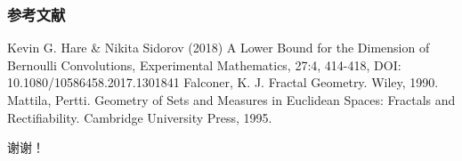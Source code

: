 \documentclass{beamer}
\numberwithin{equation}{section}
\theoremstyle{definition} \newtheorem{law}[thm]{Law}
\theoremstyle{plain} \newtheorem{jury}[thm]{Jury}
\theoremstyle{remark} \newtheorem*{marg}{Margaret}
\begin{document}
\begin{frame}
	\frametitle{参考文献}\small
	\footnotesize{
		\begin{thebibliography}{99} %

			  Kevin G. Hare \& Nikita Sidorov (2018) A Lower Bound for the Dimension of Bernoulli Convolutions, Experimental Mathematics, 27:4, 414-418, DOI: 10.1080/10586458.2017.1301841
			 Falconer, K. J. Fractal Geometry. Wiley, 1990.
			 Mattila, Pertti. Geometry of Sets and Measures in Euclidean Spaces: Fractals and Rectifiability. Cambridge University Press, 1995.

		\end{thebibliography}
	}
\end{frame}

\begin{frame}
	\Huge{\centerline{谢谢！}}
\end{frame}

\end{document}
